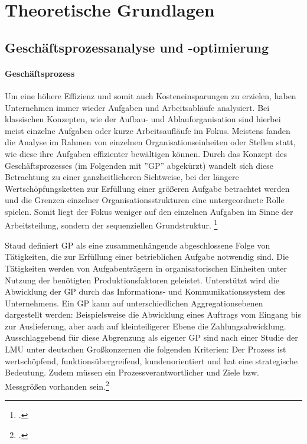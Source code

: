 \chapter{Theoretische Grundlagen}



\section{Geschäftsprozessanalyse und -optimierung}

\subsubsection{Geschäftsprozess}\label{sec:Kapitel211}

Um eine höhere Effizienz und somit auch Kosteneinsparungen  zu erzielen, haben Unternehmen immer wieder Aufgaben und Arbeitsabläufe analysiert. Bei klassischen Konzepten, wie der Aufbau- und Ablauforganisation sind hierbei meist einzelne Aufgaben oder kurze Arbeitsaufläufe im Fokus. Meistens fanden die Analyse im Rahmen von einzelnen Organisationseinheiten oder Stellen statt, wie diese ihre Aufgaben effizienter bewältigen können. Durch das Konzept des Geschäftsprozesses (im Folgenden mit ''GP'' abgekürzt) wandelt sich diese Betrachtung zu einer ganzheitlicheren Sichtweise, bei der längere Wertschöpfungsketten zur Erfüllung einer grö\ss eren Aufgabe betrachtet werden und die Grenzen einzelner Organisationsstrukturen eine untergeordnete Rolle spielen. Somit liegt der Fokus weniger auf den einzelnen Aufgaben im Sinne der Arbeitsteilung, sondern der sequenziellen Grundstruktur. \footcite[Vgl.][S. 5]{theorie_staud_geschäftsprozessanalyse_2006}

Staud definiert GP als eine zusammenhängende abgeschlossene Folge von Tätigkeiten, die zur Erfüllung einer betrieblichen Aufgabe notwendig sind. Die Tätigkeiten werden von Aufgabenträgern in organisatorischen Einheiten unter Nutzung der benötigten Produktionsfaktoren geleistet. Unterstützt wird die Abwicklung der GP durch das Informations- und Kommunikationssystem des Unternehmens. \parencite[Vgl.][S. 9]{theorie_staud_geschäftsprozessanalyse_2006} Ein GP kann auf unterschiedlichen Aggregationsebenen dargestellt werden: Beispielsweise die Abwicklung eines Auftrags vom Eingang bis zur Auslieferung, aber auch auf kleinteiligerer Ebene die Zahlungsabwicklung. Ausschlaggebend für diese Abgrenzung als eigener GP sind nach einer Studie der LMU unter deutschen Gro\ss konzernen die folgenden Kriterien: Der Prozess ist wertschöpfend, funktionsübergreifend, kundenorientiert und hat eine strategische Bedeutung. Zudem müssen ein Prozessverantwortlicher und Ziele bzw. Messgrö\ss en vorhanden sein.\footcite[Vgl.][S. 19]{theorie_koch_studie_kriterien_geschäftsprozess_2003} 

